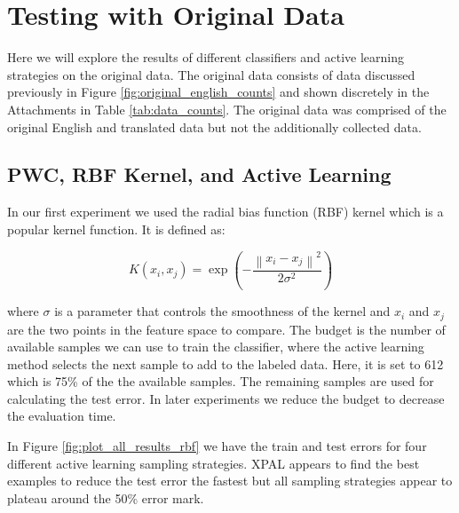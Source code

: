 \chapter{Testing with Original Data}

Here we will explore the results of different classifiers and active learning strategies on the original data. The original data consists of data discussed previously in Figure \ref{fig:original_english_counts} and shown discretely in the Attachments in Table \ref{tab:data_counts}. The original data was comprised of the original English and translated data but not the additionally collected data.

\section{PWC, RBF Kernel, and Active Learning}

In our first experiment we used the radial bias function (RBF) kernel which is a popular kernel function. It is defined as:

\begin{equation}
    K(x_i, x_j) = \exp\left(- \frac{\left\| x_i - x_j \right\|^2}{2 \sigma^2}\right)
\label{eq:rbf_kernel}
\end{equation}

where $\sigma$ is a parameter that controls the smoothness of the kernel and $x_i$ and $x_j$ are the two points in the feature space to compare. The budget is the number of available samples we can use to train the classifier, where the active learning method selects the next sample to add to the labeled data. Here, it is set to 612 which is 75\% of the the available samples. The remaining samples are used for calculating the test error. In later experiments we reduce the budget to decrease the evaluation time.

In Figure \ref{fig:plot_all_results_rbf} we have the train and test errors for four different active learning sampling strategies. XPAL appears to find the best examples to reduce the test error the fastest but all sampling strategies appear to plateau around the 50\% error mark.


